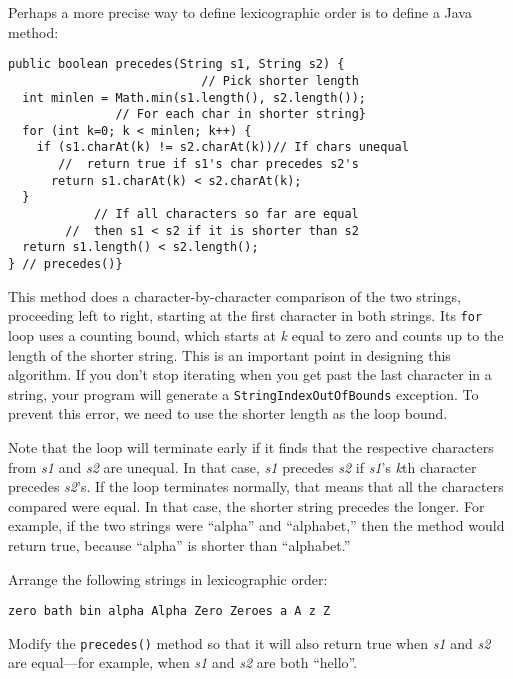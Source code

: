 \noindent Perhaps a more precise way to define lexicographic
order is to define a Java method:

\begin{jjjlisting}
\begin{lstlisting}
public boolean precedes(String s1, String s2) {
                           // Pick shorter length
  int minlen = Math.min(s1.length(), s2.length()); 
               // For each char in shorter string}
  for (int k=0; k < minlen; k++) { 
    if (s1.charAt(k) != s2.charAt(k))// If chars unequal
       //  return true if s1's char precedes s2's
      return s1.charAt(k) < s2.charAt(k); 
  }
            // If all characters so far are equal
        //  then s1 < s2 if it is shorter than s2
  return s1.length() < s2.length();  
} // precedes()}  
\end{lstlisting}
\end{jjjlisting}

\noindent This method does a character-by-character comparison of
 the two strings, proceeding left to
right, starting at the first character in both strings.  Its {\tt for}
loop uses a counting bound, which starts at {\it k} equal to zero and
counts up to the length of the shorter string.  This is an important
point in designing this algorithm.  If you don't stop iterating when
you get past the last character in a string, your program will
generate a {\tt StringIndexOutOfBounds} exception.  To prevent this
error, we need to use the shorter length as the loop bound.

Note that the loop will terminate early if it finds that the
respective characters from {\it s1} and {\it s2} are unequal.  In that
case, {\it s1} precedes {\it s2} if {\it s1}'s {\it k}th character
precedes {\it s2}'s.  If the loop terminates normally, that means that
all the characters compared were equal.  In that case, the shorter
string precedes the longer.  For example, if the two strings were
``alpha'' and ``alphabet,'' then the method would return true, because
``alpha'' is shorter than ``alphabet.''

\label{self-study-exercises}
\begin{SSTUDY}
\item  Arrange the following strings in lexicographic order:

\begin{jjjlisting}
\begin{lstlisting}
zero bath bin alpha Alpha Zero Zeroes a A z Z
\end{lstlisting}
\end{jjjlisting}


\item  Modify the {\tt precedes()} method so that it will also return true
when {\it s1} and {\it s2} are equal---for example, when
{\it s1} and {\it s2} are both ``hello''.

\end{SSTUDY}


